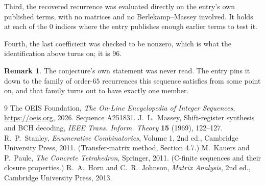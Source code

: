 \documentclass[11pt,a4paper]{article}
\theoremstyle{plain}
\theoremstyle{definition}
\newtheorem{remark}[theorem]{Remark}
\begin{document}
Third, the recovered recurrence was evaluated directly on the entry's own published terms, with
no matrices and no Berlekamp--Massey involved. It holds at each of the $0$ indices where
the entry publishes enough earlier terms to test it.

Fourth, the last coefficient was checked to be nonzero, which is what the identification above
turns on; it is $96$.

\begin{remark}
The conjecture's own statement was never read. The entry pins it down to the family of
order-$65$ recurrences this sequence satisfies from some point on, and that family turns
out to have exactly one member.
\end{remark}

\begin{thebibliography}{9}
 The OEIS Foundation, \emph{The On-Line Encyclopedia of Integer
Sequences}, \url{https://oeis.org}, 2026. Sequence A251831.
 J.~L.~Massey, Shift-register synthesis and BCH decoding, \emph{IEEE
Trans. Inform. Theory} \textbf{15} (1969), 122--127.
 R.~P.~Stanley, \emph{Enumerative Combinatorics}, Volume 1, 2nd ed.,
Cambridge University Press, 2011. (Transfer-matrix method, Section 4.7.)
 M.~Kauers and P.~Paule, \emph{The Concrete Tetrahedron}, Springer, 2011.
(C-finite sequences and their closure properties.)
 R.~A.~Horn and C.~R.~Johnson, \emph{Matrix Analysis}, 2nd ed., Cambridge
University Press, 2013.
\end{thebibliography}
\end{document}
